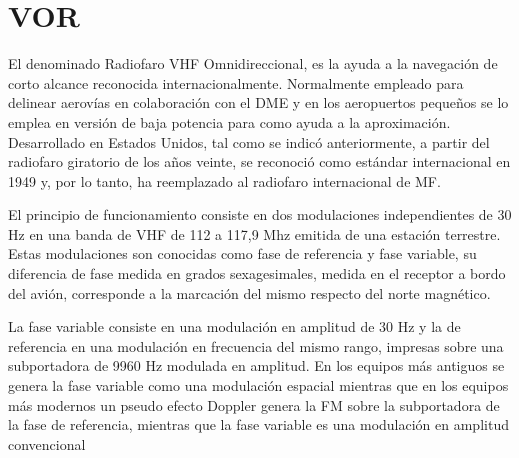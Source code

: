 \section*{VOR}

El denominado Radiofaro VHF Omnidireccional, es la ayuda a la navegación de corto alcance reconocida internacionalmente. Normalmente empleado para delinear aerovías en colaboración con el DME y en los aeropuertos pequeños se lo emplea en versión de baja potencia para como ayuda a la aproximación. Desarrollado en Estados Unidos, tal como se indicó anteriormente, a partir del radiofaro giratorio de los años veinte, se reconoció como estándar internacional en 1949 y, por lo tanto, ha reemplazado al radiofaro internacional de MF.

El principio de funcionamiento consiste en dos modulaciones independientes de 30 Hz en una banda de VHF de 112 a 117,9 Mhz emitida de una estación terrestre. Estas modulaciones son conocidas como fase de referencia  y fase variable, su diferencia de fase medida en grados sexagesimales, medida en el receptor a bordo del avión, corresponde a la marcación del mismo respecto del norte magnético.

La fase variable consiste en una modulación en amplitud de 30 Hz y la de referencia en una modulación en frecuencia del mismo rango, impresas sobre una subportadora de 9960 Hz modulada en amplitud. En los equipos más antiguos se genera la fase variable como una modulación espacial mientras que en los equipos más modernos un pseudo efecto Doppler genera la FM sobre la subportadora de la fase de referencia, mientras que la fase variable es una modulación en amplitud convencional


